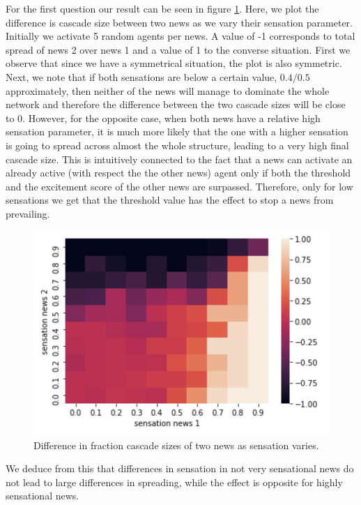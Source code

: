 \documentclass[10pt]{article}
\begin{document}
For the first question our result can be seen in figure \ref{fig:sens_vs_sens}. Here, we plot the difference is cascade size between two news as we vary their sensation parameter. Initially we activate 5 random agents per news. A value of -1 corresponds to total spread of news 2 over news 1 and a value of 1 to the converse situation.  First we observe that since we have a symmetrical situation, the plot is also symmetric. Next, we note that if both sensations are below a certain value, $0.4/0.5$ approximately, then neither of the news will manage to dominate the whole network and therefore the difference between the two cascade sizes will be close to 0. However, for the opposite case, when both news have a relative high sensation parameter, it is much more likely that the one with a higher sensation is going to spread across almost the whole structure, leading to a very high final cascade size. This is intuitively connected to the fact that a news can activate an already active (with respect the the other news) agent only if both the threshold and the excitement score of the other news are surpassed. Therefore, only for low sensations we get that the threshold value has the effect to stop a news from prevailing.
\begin{figure}
\centering
\includegraphics[width=.7\linewidth]{images/sens_vs_sens.png}
\caption{Difference in fraction cascade sizes of two news as sensation varies.}
\label{fig:sens_vs_sens}
\end{figure}
We deduce from this that differences in sensation in not very sensational news do not lead to large differences in spreading, while the effect is opposite for highly sensational news. \\
\end{document}
